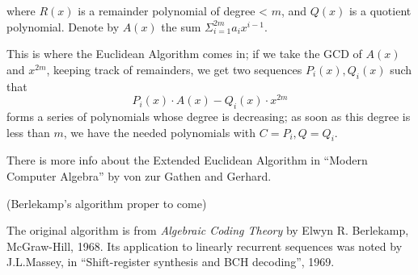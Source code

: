 \documentclass[12pt]{article}
\begin{document}
where $R(x)$ is a remainder polynomial of degree < $m$, and $Q(x)$ is a quotient polynomial. Denote by $A(x)$ the sum $\Sigma_{i=1}^{2m}a_ix^{i-1}$. 

This is where the Euclidean Algorithm comes in; if we take the GCD of $A(x)$ and $x^{2m}$, keeping track of remainders, we get two sequences $P_i(x), Q_i(x)$ such that
$$P_i(x)\cdot A(x) - Q_i(x)\cdot x^{2m}$$
forms a series of polynomials whose degree is decreasing; as soon as this degree is less than $m$, we have the needed polynomials with $C=P_i, Q=Q_i$.

There is more info about the Extended Euclidean Algorithm in ``Modern Computer Algebra'' by von zur Gathen and Gerhard. 

(Berlekamp's algorithm proper to come)

The original algorithm is from \emph{Algebraic Coding Theory} by Elwyn R. Berlekamp, McGraw-Hill, 1968. Its application to linearly recurrent sequences was noted by J.L.Massey, in ``Shift-register synthesis and BCH decoding'', 1969.
\end{document}

